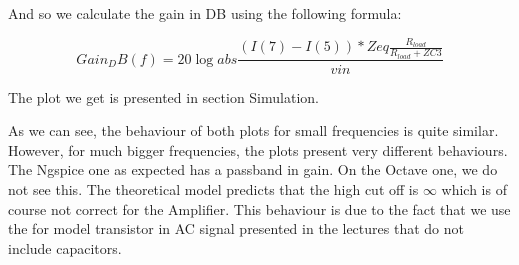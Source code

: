 And so we calculate the gain in DB using the following formula:

\begin{equation}
  Gain_DB(f) =20 \log{abs\frac{(I(7) - I(5)) * Zeq \frac{R_{load}}{R_{load} + ZC3}}{vin}}
\end{equation}

The plot we get is presented in section Simulation.

As we can see, the behaviour of both plots for small frequencies is quite similar. However, for much bigger frequencies, the plots present very different
behaviours. The Ngspice one as expected has a passband in gain. On the Octave one, we do not see this. The theoretical model predicts that the
high cut off is $\infty$ which is of course not correct for the Amplifier.
This behaviour is due to the fact that we use the for model transistor in AC signal presented in the lectures that do not include capacitors.





